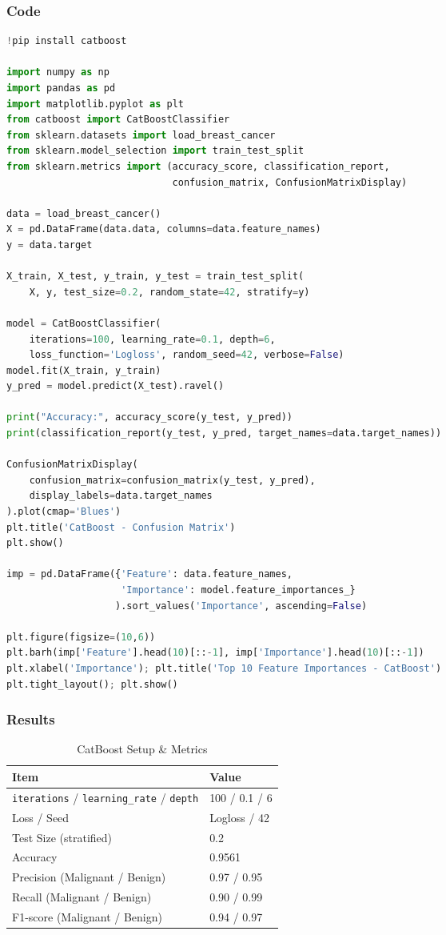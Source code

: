 \documentclass[a4paper,10pt]{article}
\begin{document}
\subsubsection{Code}
\begin{lstlisting}[language=Python, caption={CatBoost Implementation}]
!pip install catboost

import numpy as np
import pandas as pd
import matplotlib.pyplot as plt
from catboost import CatBoostClassifier
from sklearn.datasets import load_breast_cancer
from sklearn.model_selection import train_test_split
from sklearn.metrics import (accuracy_score, classification_report,
                             confusion_matrix, ConfusionMatrixDisplay)

data = load_breast_cancer()
X = pd.DataFrame(data.data, columns=data.feature_names)
y = data.target

X_train, X_test, y_train, y_test = train_test_split(
    X, y, test_size=0.2, random_state=42, stratify=y)

model = CatBoostClassifier(
    iterations=100, learning_rate=0.1, depth=6,
    loss_function='Logloss', random_seed=42, verbose=False)
model.fit(X_train, y_train)
y_pred = model.predict(X_test).ravel()

print("Accuracy:", accuracy_score(y_test, y_pred))
print(classification_report(y_test, y_pred, target_names=data.target_names))

ConfusionMatrixDisplay(
    confusion_matrix=confusion_matrix(y_test, y_pred),
    display_labels=data.target_names
).plot(cmap='Blues')
plt.title('CatBoost - Confusion Matrix')
plt.show()

imp = pd.DataFrame({'Feature': data.feature_names,
                    'Importance': model.feature_importances_}
                   ).sort_values('Importance', ascending=False)

plt.figure(figsize=(10,6))
plt.barh(imp['Feature'].head(10)[::-1], imp['Importance'].head(10)[::-1])
plt.xlabel('Importance'); plt.title('Top 10 Feature Importances - CatBoost')
plt.tight_layout(); plt.show()
\end{lstlisting}

\subsubsection{Results}
\begin{table}[H]
\centering
\caption{CatBoost Setup \& Metrics}
\begin{tabular}{ll}
\toprule
\textbf{Item} & \textbf{Value} \\
\midrule
\texttt{iterations} / \texttt{learning\_rate} / \texttt{depth} & 100 / 0.1 / 6 \\
Loss / Seed & Logloss / 42 \\
Test Size (stratified) & 0.2 \\
Accuracy & 0.9561 \\
Precision (Malignant / Benign) & 0.97 / 0.95 \\
Recall (Malignant / Benign) & 0.90 / 0.99 \\
F1-score (Malignant / Benign) & 0.94 / 0.97 \\
\bottomrule
\end{tabular}
\end{table}
\end{document}
